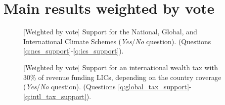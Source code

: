 \clearpage
\section{Main results weighted by vote}\label{app:vote}
\begin{figure}[h!]
    \caption[{[}Weighted by vote{]} Support for the NCS, GCS, ICS]{[Weighted by vote] Support for the National, Global, and International Climate Schemes (\textit{Yes}/\textit{No} question). \hfill (Questions \ref{q:ncs_support}-\ref{q:ics_support}).
    }\label{fig:ics_weight_vote}
\end{figure}

\begin{figure}[h!]
    \caption[{[}Weighted by vote{]} Support for an int'l wealth tax depending on coverage]{[Weighted by vote] Support for an international wealth tax with 30\% of revenue funding LICs, depending on the country coverage (\textit{Yes}/\textit{No} question). \hfill (Questions \ref{q:global_tax_support}-\ref{q:intl_tax_support}).
    }\label{fig:wealth_tax_weight_vote}
\end{figure}

